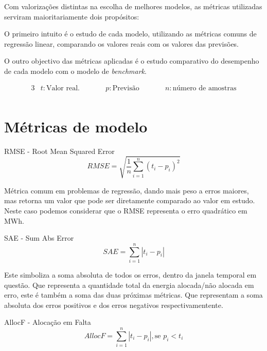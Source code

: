 Com valorizações distintas na escolha de melhores modelos, as métricas utilizadas serviram maioritariamente dois propósitos:\par
O primeiro intuito é o estudo de cada modelo, utilizando as métricas comuns de regressão linear, comparando os valores reais com os valores das previsões.\par
O outro objectivo das métricas aplicadas é o estudo comparativo do desempenho de cada modelo com o modelo de \textit{benchmark}.\par

\begin{alignat*}{3} 
& t : \text{Valor real.} &\qquad& p : \text{Previsão} &\qquad& n : \text{número de amostras} \\
\end{alignat*}


\section{Métricas de modelo}

\bigskip
RMSE - Root Mean Squared Error \\

\begin{equation} \label{eq:rmse} 
    RMSE = \sqrt{\frac{1}{n} \sum_{i=1}^{n}(t_i - p_i)^2} 
\end{equation}
\smallskip

Métrica comum em problemas de regressão, dando mais peso a erros maiores, mas retorna um valor que pode ser diretamente comparado ao valor em estudo. Neste caso podemos considerar que o RMSE representa o erro quadrático em MWh.\par
\bigskip
SAE - Sum Abs Error \\


\begin{equation} \label{eq:sae} 
    SAE = \sum_{i=1}^{n}\left|t_i - p_i \right|
\end{equation}
\smallskip

Este simboliza a soma absoluta de todos os erros, dentro da janela temporal em questão. Que representa a quantidade total da energia alocada/não alocada em erro, este é também a soma das duas próximas métricas. Que representam a soma absoluta dos erros positivos e dos erros negativos respectivamentente.\par
\bigskip
AllocF - Alocação em Falta \\


\begin{equation} \label{eq:allocf} 
    AllocF = \sum_{i=1}^{n}\left|t_i - p_i \right| , \text{se } p_i < t_i
\end{equation}
\smallskip


